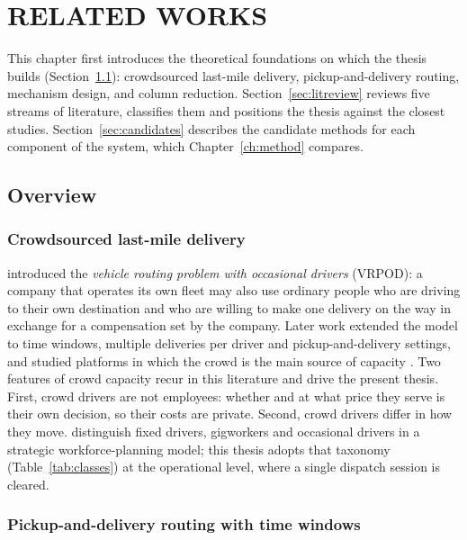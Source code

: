 \chapter{RELATED WORKS}
\label{ch:related}

This chapter first introduces the theoretical foundations on which the
thesis builds (Section~\ref{sec:overview-foundations}): crowdsourced
last-mile delivery, pickup-and-delivery routing, mechanism design, and
column reduction. Section~\ref{sec:litreview} reviews five streams of
literature, classifies them and positions the thesis against the closest
studies. Section~\ref{sec:candidates} describes the candidate methods for
each component of the system, which Chapter~\ref{ch:method} compares.

\section{Overview}
\label{sec:overview-foundations}

\subsection{Crowdsourced last-mile delivery}

\citet{archetti2016vrpod} introduced the \emph{vehicle routing problem with
occasional drivers} (VRPOD): a company that operates its own fleet may also
use ordinary people who are driving to their own destination and who are
willing to make one delivery on the way in exchange for a compensation set by
the company. Later work extended the model to time windows, multiple
deliveries per driver and pickup-and-delivery settings, and studied
platforms in which the crowd is the main source of capacity
\citep{alnaggar2021crowdsourced,savelsbergh2022challenges}. Two features of
crowd capacity recur in this literature and drive the present thesis.
First, crowd drivers are not employees: whether and at what price they
serve is their own decision, so their costs are private. Second, crowd
drivers differ in how they move. \citet{luy2024workforce} distinguish fixed
drivers, gigworkers and occasional drivers in a strategic workforce-planning
model; this thesis adopts that taxonomy (Table~\ref{tab:classes}) at the
operational level, where a single dispatch session is cleared.

\subsection{Pickup-and-delivery routing with time windows}

